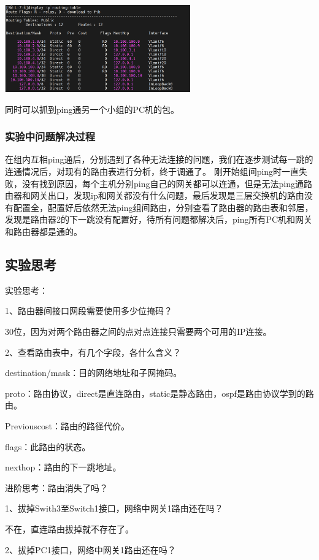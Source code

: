 \documentclass{article}
\begin{document}
\vspace{10pt}
\centerline{\includegraphics[width=0.6\textwidth]{4_1_images/5.png}}
\vspace{10pt}

同时可以抓到ping通另一个小组的PC机的包。

\subsubsection{实验中问题解决过程}
在组内互相ping通后，分别遇到了各种无法连接的问题，我们在逐步测试每一跳的连通情况后，对现有的路由表进行分析，终于调通了。
刚开始组间ping时一直失败，没有找到原因，每个主机分别ping自己的网关都可以连通，但是无法ping通路由器和网关出口，发现ip和网关都没有什么问题，最后发现是三层交换机的路由没有配置全，配置好后依然无法ping组间路由，分别查看了路由器的路由表和邻居，发现是路由器2的下一跳没有配置好，待所有问题都解决后，ping所有PC机和网关和路由器都是通的。

\subsection{实验思考}
实验思考：

1、路由器间接口网段需要使用多少位掩码？

30位，因为对两个路由器之间的点对点连接只需要两个可用的IP连接。

2、查看路由表中，有几个字段，各什么含义？

destination/mask：目的网络地址和子网掩码。

proto：路由协议，direct是直连路由，static是静态路由，ospf是路由协议学到的路由。

Previouscost：路由的路径代价。

flags：此路由的状态。

nexthop：路由的下一跳地址。


进阶思考：路由消失了吗？

1、拔掉Swith3至Switch1接口，网络中网关1路由还在吗？

不在，直连路由拔掉就不存在了。

2、拔掉PC1接口，网络中网关1路由还在吗？
\end{document}
